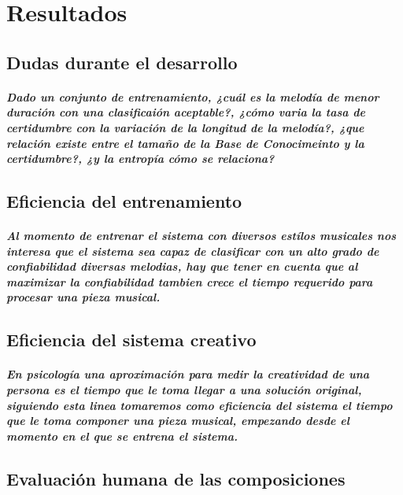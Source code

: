 \chapter{Resultados}
\section{Dudas durante el desarrollo}
\paragraph{Dado un conjunto de entrenamiento, ¿cuál es la melodía de menor duración con una clasificaión aceptable?, ¿cómo varia la tasa de certidumbre con la variación de la longitud de la melodía?, ¿que relación existe entre el tamaño de la Base de Conocimeinto y la certidumbre?, ¿y la entropía cómo se relaciona?}


\section {Eficiencia del entrenamiento}
\paragraph {Al momento de entrenar el sistema con diversos estílos musicales nos interesa que el sistema sea capaz de clasificar con un alto grado de confiabilidad diversas melodias, hay que tener en cuenta que al maximizar la confiabilidad tambien crece el tiempo requerido para procesar una pieza musical.}

\section {Eficiencia del sistema creativo}
\paragraph {En psicología una aproximación para medir la creatividad de una persona es el tiempo que le toma llegar a una solución original, siguiendo esta linea tomaremos como eficiencia del sistema el tiempo que le toma componer una pieza musical, empezando desde el momento en el que se entrena el sistema.}

\section {Evaluación humana de las composiciones}
        
